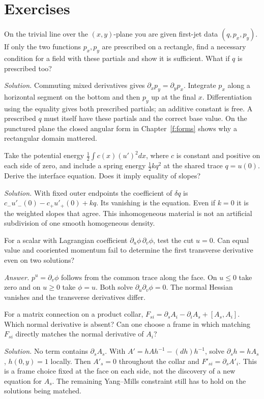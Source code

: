 \section*{Exercises}
\begin{exercise}On the trivial line over the $(x,y)$-plane you are given first-jet data $(q,p_x,p_y)$. If only the two functions $p_x,p_y$ are prescribed on a rectangle, find a necessary condition for a field with these partials and show it is sufficient. What if $q$ is prescribed too?\end{exercise}
\noindent\emph{Solution.} Commuting mixed derivatives gives $\partial_xp_y=\partial_yp_x$. Integrate $p_x$ along a horizontal segment on the bottom and then $p_y$ up at the final $x$. Differentiation using the equality gives both prescribed partials; an additive constant is free. A prescribed $q$ must itself have these partials and the correct base value. On the punctured plane the closed angular form in Chapter~\ref{f:forms} shows why a rectangular domain mattered.
\begin{exercise}Take the potential energy $\frac12\int c(x)(u')^2dx$, where $c$ is constant and positive on each side of zero, and include a spring energy $\tfrac12 kq^2$ at the shared trace $q=u(0)$. Derive the interface equation. Does it imply equality of slopes?\end{exercise}
\noindent\emph{Solution.} With fixed outer endpoints the coefficient of $\delta q$ is $c_-u'_-(0)-c_+u'_+(0)+kq$. Its vanishing is the equation. Even if $k=0$ it is the weighted slopes that agree. This inhomogeneous material is not an artificial subdivision of one smooth homogeneous density.
\begin{exercise}For a scalar with Lagrangian coefficient $\partial_u\phi\,\partial_v\phi$, test the cut $u=0$. Can equal value and cooriented momentum fail to determine the first transverse derivative even on two solutions?\end{exercise}
\noindent\emph{Answer.} $p^u=\partial_v\phi$ follows from the common trace along the face. On $u\le0$ take zero and on $u\ge0$ take $\phi=u$. Both solve $\partial_u\partial_v\phi=0$. The normal Hessian vanishes and the transverse derivatives differ.
\begin{exercise}For a matrix connection on a product collar, $F_{si}=\partial_s A_i-\partial_i A_s+[A_s,A_i]$. Which normal derivative is absent? Can one choose a frame in which matching $F_{si}$ directly matches the normal derivative of $A_i$?\end{exercise}
\noindent\emph{Solution.} No term contains $\partial_sA_s$. With $A'=hAh^{-1}-(dh)h^{-1}$, solve $\partial_s h=hA_s$, $h(0,y)=1$ locally. Then $A'_s=0$ throughout the collar and $F'_{si}=\partial_sA'_i$. This is a frame choice fixed at the face on each side, not the discovery of a new equation for $A_s$. The remaining Yang--Mills constraint still has to hold on the solutions being matched.
